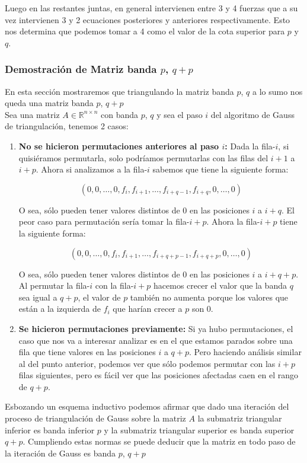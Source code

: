 Luego en las restantes juntas, en general intervienen entre 3 y 4 fuerzas que a su vez intervienen 3 y 2 ecuaciones posteriores y anteriores respectivamente. Esto nos determina que podemos tomar a 4 como el valor de la cota superior para $p$ y $q$.

\subsubsection{Demostración de Matriz banda $p$, $q + p$}

En esta sección mostraremos que triangulando la matriz banda $p$, $q$ a lo sumo nos queda una matriz banda $p$, $q + p$\\

Sea una matriz $A \in \mathbb{R}^{n \times n}$ con banda $p$, $q$ y sea el paso $i$ del algoritmo de Gauss de triangulación, tenemos 2 casos:

\begin{enumerate}
    \item {\bf No se hicieron permutaciones anteriores al paso $i$:} Dada la fila-$i$, si quisiéramos permutarla, solo podríamos permutarlas con las filas del $i + 1$ a $i + p$. Ahora si analizamos a la fila-$i$ sabemos que tiene la siguiente forma:

    \begin{displaymath}
        (0, 0, \dots, 0, f_i, f_{i + 1}, \dots, f_{i + q - 1}, f_{i + q}, 0, \dots, 0)
    \end{displaymath}

    O sea, sólo pueden tener valores distintos de $0$ en las posiciones $i$ a $i + q$. El peor caso para permutación sería tomar la fila-${i + p}$. Ahora la fila-${i + p}$ tiene la siguiente forma:

    \begin{displaymath}
        (0, 0, \dots, 0, f_i, f_{i + 1}, \dots, f_{i + q + p - 1}, f_{i + q + p}, 0, \dots, 0)
    \end{displaymath}

    O sea, sólo pueden tener valores distintos de $0$ en las posiciones $i$ a $i + q + p$. Al permutar la fila-$i$ con la fila-${i + p}$ hacemos crecer el valor que la banda $q$ sea igual a $q + p$, el valor de $p$ también no aumenta porque los valores que están a la izquierda de $f_i$ que harían crecer a $p$ son 0.

    \item {\bf Se hicieron permutaciones previamente:} Si ya hubo permutaciones, el caso que nos va a interesar analizar es en el que estamos parados sobre una fila que tiene valores en las posiciones $i$ a $q + p$. Pero haciendo análisis similar al del punto anterior, podemos ver que sólo podemos permutar con las $i + p$ filas siguientes, pero es fácil ver que las posiciones afectadas caen en el rango de $q + p$.
\end{enumerate}

Esbozando un esquema inductivo podemos afirmar que dado una iteración del proceso de triangulación de Gauss sobre la matriz $A$ la submatriz triangular inferior es banda inferior $p$ y la submatriz triangular superior es banda superior $q + p$. Cumpliendo estas normas se puede deducir que la matriz en todo paso de la iteración de Gauss es banda $p$, $q + p$
